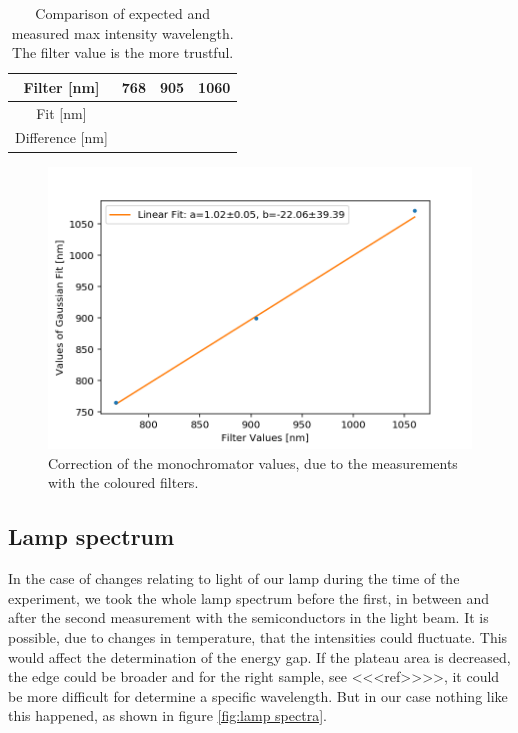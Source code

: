 \documentclass[]{article}
\begin{document}
\begin{table}[H]
	\centering
	\begin{tabular}{c|c|c|c}
	Filter [nm] & 768 & 905 & 1060 \\ \hline
	Fit [nm] &  &  &  \\ \hline
	Difference [nm] &  &  & 
	\end{tabular}
	\caption{Comparison of expected and measured max intensity wavelength. The filter value is the more trustful.}
\end{table}

\begin{figure}[H]
\centering
\includegraphics[width=.9\textwidth]{Plots/LambdaCorrection.png}
\caption{Correction of the monochromator values, due to the measurements with the coloured filters.}
\label{fig:LambdaCorrection}
\end{figure}

\subsection{Lamp spectrum}
In the case of changes relating to light of our lamp during the time of the experiment, we took the whole lamp spectrum before the first, in between and after the second measurement with the semiconductors in the light beam. It is possible, due to changes in temperature, that the intensities could fluctuate. This would affect the determination of the energy gap. If the plateau area is decreased, the edge could be broader and for the right sample, see <<<ref>>>>, it could be more difficult for determine a specific wavelength. But in our case nothing like this happened, as shown in figure \ref{fig:lamp spectra}.
\end{document}
